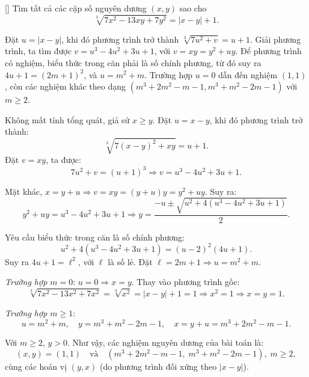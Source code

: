 \documentclass[../04-diophantine-equations.tex]{subfiles}
\begin{document}
\begin{example*}\label{example:GER-2015-TST-P4}[\textbf{}]
	Tìm tất cả các cặp số nguyên dương \((x, y)\) sao cho
	\[
		\sqrt[3]{7x^2 - 13xy + 7y^2} = |x - y| + 1.
	\]
\end{example*}

\begin{story*}
    Đặt \( u = |x - y| \), khi đó phương trình trở thành \( \sqrt[3]{7u^2 + v} = u + 1 \).  
    Giải phương trình, ta tìm được \( v = u^3 - 4u^2 + 3u + 1 \), với \( v = xy = y^2 + uy \).  
    Để phương trình có nghiệm, biểu thức trong căn phải là số chính phương, từ đó suy ra \( 4u + 1 = (2m + 1)^2 \), và \( u = m^2 + m \).  
    Trường hợp \( u = 0 \) dẫn đến nghiệm \( (1,1) \), còn các nghiệm khác theo dạng \( (m^3 + 2m^2 - m - 1, m^3 + m^2 - 2m - 1) \) với \( m \ge 2 \).
\end{story*}

\begin{soln}\footnotemark
	Không mất tính tổng quát, giả sử \( x \ge y \). Đặt \( u = x - y \), khi đó phương trình trở thành:
	\[
		\sqrt[3]{7(x - y)^2 + xy} = u + 1.
	\]
	Đặt \( v = xy \), ta được:
	\[
		7u^2 + v = (u + 1)^3 \Rightarrow v = u^3 - 4u^2 + 3u + 1.
	\]
	
	Mặt khác, \( x = y + u \Rightarrow v = x y = (y + u)y = y^2 + uy \). Suy ra:
	\[
		y^2 + uy = u^3 - 4u^2 + 3u + 1 
		\Rightarrow y = \frac{-u \pm \sqrt{u^2 + 4(u^3 - 4u^2 + 3u + 1)}}{2}.
	\]
	
	Yêu cầu biểu thức trong căn là số chính phương:
	\[
		u^2 + 4(u^3 - 4u^2 + 3u + 1) = (u - 2)^2 (4u + 1).
	\]
	Suy ra \( 4u + 1 = \ell^2 \), với \( \ell \) là số lẻ. Đặt \( \ell = 2m + 1 \Rightarrow u = m^2 + m \).

	\textit{Trường hợp \( m = 0 \)}: \( u = 0 \Rightarrow x = y \). Thay vào phương trình gốc:
	\[
		\sqrt[3]{7x^2 - 13x^2 + 7x^2} = \sqrt[3]{x^2} = |x - y| + 1 = 1 \Rightarrow x^2 = 1 \Rightarrow x = y = 1.
	\]
	
	\textit{Trường hợp \( m \ge 1 \)}:  
	\[
		u = m^2 + m, \quad y = m^3 + m^2 - 2m - 1, \quad x = y + u = m^3 + 2m^2 - m - 1.
	\]
	
	Với \( m \ge 2 \), \( y > 0 \). Như vậy, các nghiệm nguyên dương của bài toán là:
	\[
		(x, y) = (1, 1) \quad \text{và} \quad \left(m^3 + 2m^2 - m - 1,\; m^3 + m^2 - 2m - 1\right),\; m \ge 2,
	\]
	cùng các hoán vị \((y,x)\) (do phương trình đối xứng theo \( |x - y| \)).
\end{soln}

\end{document}
